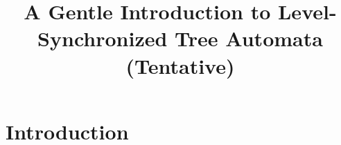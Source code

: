 \documentclass{llncs}
\title{A Gentle Introduction to Level-Synchronized Tree Automata (Tentative)}
\begin{document}
\maketitle


\begin{abstract}

\end{abstract}

\section{Introduction}\label{sec:introduction}
\end{document}

